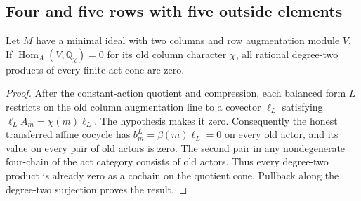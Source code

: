 \subsection{Four and five rows with five outside elements}

\begin{lemma}
\label{C:missing-column-character-act-cups}
Let $M$ have a minimal ideal with two columns and row
augmentation module $V$.  If
$\operatorname{Hom}_A(V,\mathbb Q_\chi)=0$ for its old
column character $\chi$, all rational degree-two products
of every finite act cone are zero.
\end{lemma}
\begin{proof}
After the constant-action quotient and compression, each
balanced form $L$ restricts on the old column augmentation
line to a covector $\ell_L$ satisfying
$\ell_L A_m=\chi(m)\ell_L$.
The hypothesis makes it zero.  Consequently the honest
transferred affine cocycle has
$b^L_m=\beta(m)\ell_L=0$ on every old actor, and its value
on every pair of old actors is zero.  The second pair in
any nondegenerate four-chain of the act category consists
of old actors.  Thus every degree-two product is already
zero as a cochain on the quotient cone.  Pullback along
the degree-two surjection proves the result.
\end{proof}

